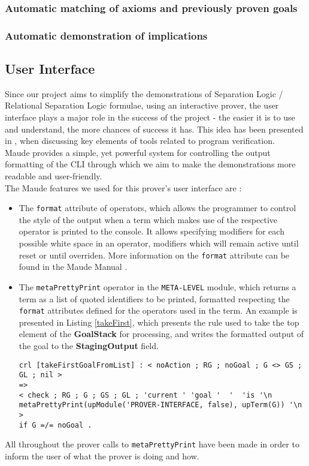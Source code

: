 \documentclass[12pt,a4paper]{article}
\begin{document}
{\subsubsection{Automatic matching of axioms and previously proven goals}
\subsubsection{Automatic demonstration of implications}
\subsection{User Interface}
Since our project aims to simplify the demonstrations of Separation Logic / Relational Separation Logic formulae, using an interactive prover, the user interface plays a major role in the success of the project - the easier it is to use and understand, the more chances of success it has. This idea has been presented in \cite{primer}, when discussing key elements of tools related to program verification. \\

Maude provides a simple, yet powerful system for controlling the output formatting of the CLI through which we aim to make the demonstrations more readable and user-friendly. \\

The Maude features we used for this prover's user interface are :
\begin{itemize}
	\item The \texttt{format} attribute of operators, which allows the programmer to control the style of the output when a term which makes use of the respective operator is printed to the console. It allows specifying modifiers for each possible white space in an operator, modifiers which will remain active until reset or until overriden. More information on the \texttt{format} attribute can be found in the Maude Manual \cite{manual}.
	\item The \texttt{metaPrettyPrint} operator in the \texttt{META-LEVEL} module, which returns a term as a list of quoted identifiers to be printed, formatted respecting the \texttt{format} attributes defined for the operators used in the term. An example is presented in Listing \ref{takeFirst}, which presents the rule used to take the top element of the \textbf{GoalStack} for processing, and writes the formatted output of the goal to the \textbf{StagingOutput} field.
	\begin{lstlisting}[label=takeFirst,caption=Rewrite rule making use of metaPrettyPrint]
crl [takeFirstGoalFromList] : < noAction ; RG ; noGoal ; G <> GS ; GL ; nil > 
=> 
< check ; RG ; G ; GS ; GL ; 'current ' 'goal '  '  'is '\n metaPrettyPrint(upModule('PROVER-INTERFACE, false), upTerm(G)) '\n > 
if G =/= noGoal .
	\end{lstlisting}
\end{itemize}
All throughout the prover calls to \texttt{metaPrettyPrint} have been made in order to inform the user of what the prover is doing and how.
\\

}
\end{document}
